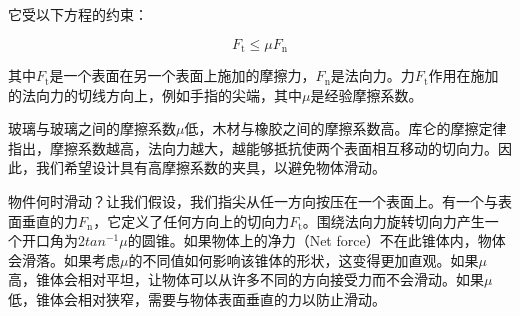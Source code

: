 它受以下方程的约束：

\begin{equation}
F_\mathrm{t} \leq \mu F_\mathrm{n}
\end{equation}


其中$F_\mathrm{t}$是一个表面在另一个表面上施加的摩擦力，$F_\mathrm{n}$是法向力。力$F_\mathrm{t}$作用在施加的法向力的切线方向上，例如手指的尖端，其中$\mu$是经验摩擦系数。


玻璃与玻璃之间的摩擦系数$\mu$低，木材与橡胶之间的摩擦系数高。库仑的摩擦定律指出，摩擦系数越高，法向力越大，越能够抵抗使两个表面相互移动的切向力。因此，我们希望设计具有高摩擦系数的夹具，以避免物体滑动。


物件何时滑动？让我们假设，我们指尖从任一方向按压在一个表面上。有一个与表面垂直的力$F_\mathrm{n}$，它定义了任何方向上的切向力$F_\mathrm{t}$。围绕法向力旋转切向力产生一个开口角为$2tan^{-1}\mu$的圆锥。如果物体上的净力（Net force）不在此锥体内，物体会滑落。如果考虑$\mu$的不同值如何影响该锥体的形状，这变得更加直观。如果$\mu$高，锥体会相对平坦，让物体可以从许多不同的方向接受力而不会滑动。如果$\mu$低，锥体会相对狭窄，需要与物体表面垂直的力以防止滑动。

